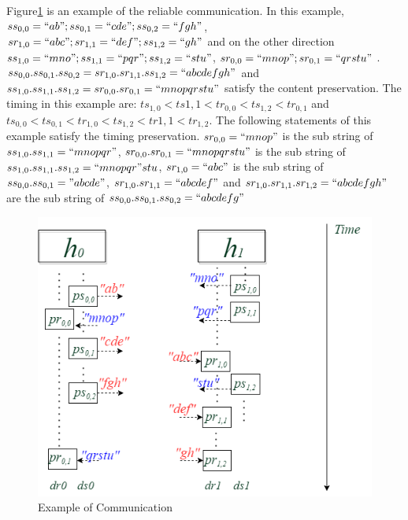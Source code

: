 Figure\ref{reliableexample} is an example of the reliable communication. In this example, $ss_{0,0}=``ab" ; ss_{0,1}=``cde"; ss_{0,2}=``fgh"$, $sr_{1,0}=``abc" ; sr_{1,1}=``def"; ss_{1,2}=``gh"$ and on the other direction $ss_{1,0}=``mno" ; ss_{1,1}=``pqr"; ss_{1,2}=``stu"$, $sr_{0,0}=``mnop" ; sr_{0,1}=``qrstu"$ . $ss_{0,0}.ss_{0,1}.ss_{0,2} = sr_{1,0}.sr_{1,1}.ss_{1,2} = ``abcdefgh"$ and $ss_{1,0}.ss_{1,1}.ss_{1,2} = sr_{0,0}.sr_{0,1}= ``mnopqrstu"$ satisfy the content preservation. The timing in this example are: $ts_{1,0} < ts{1,1} < tr_{0,0}< ts_{1,2} < tr_{0,1}$ and $ts_{0,0} < ts_{0,1} < tr_{1,0} < ts_{1,2} < tr{1,1} < tr_{1,2}$. The following statements of this example satisfy the timing preservation. $sr_{0,0} = ``mnop"$ is the sub string of $ss_{1,0}.ss_{1,1} = ``mnopqr"$, $sr_{0,0}.sr_{0,1}=``mnopqrstu"$ is the sub string of $ss_{1,0}.ss_{1,1}.ss_{1,2} = ``mnopqr"stu$, $sr_{1,0}=``abc"$ is the sub string of $ss_{0,0}.ss_{0,1}="abcde"$, $sr_{1,0}.sr_{1,1}= ``abcdef"$ and $sr_{1,0}.sr_{1,1}.sr_{1,2} = ``abcdefgh"$ are the sub string of  $ss_{0,0}.ss_{0,1}.ss_{0,2} = ``abcdefg"$
\begin{figure}[H]
\centerline{\includegraphics[scale=0.55]{Figures/reliableexample}}
\caption{Example of Communication}
\label{reliableexample}
\end{figure}

